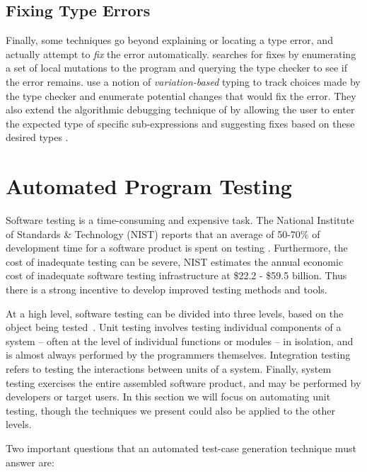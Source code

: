 \subsection{Fixing Type Errors}
\label{sec:fixing-type-errors}
Finally, some techniques go beyond explaining or locating a type error,
and actually attempt to \emph{fix} the error automatically.
%
\citet{Lerner2007-dt} searches for fixes by enumerating a
set of local mutations to the program and querying the type checker to
see if the error remains.
%
\citet{Chen2014-gd} use a notion of \emph{variation-based} typing to
track choices made by the type checker and enumerate potential
changes that would fix the error.
%
They also extend the algorithmic debugging technique of
\citeauthor{Chitil2001-td} by allowing the user to enter the expected
type of specific sub-expressions and suggesting fixes based on these
desired types \citep{Chen2014-vm}.

\section{Automated Program Testing}
\label{sec:automated-program-testing}

Software testing is a time-consuming and expensive task. The National
Institute of Standards \& Technology (NIST) reports that an average of
50-70\% of development time for a software product is spent on testing
\citep{tassey_economic_2002}.
%
Furthermore, the cost of inadequate testing can be severe, NIST
estimates the annual economic cost of inadequate software testing
infrastructure at \$22.2 - \$59.5 billion.
%
Thus there is a strong incentive to develop improved testing methods and
tools.

At a high level, software testing can be divided into three levels,
based on the object being tested~\citep{bourque_swebok:_2014}.
%
Unit testing involves testing individual components of a system --
often at the level of individual functions or modules -- in isolation,
and is almost always performed by the programmers
themselves.
%
Integration testing refers to testing the interactions between units of
a system.
%
Finally, system testing exercises the entire assembled software
product, and may be performed by developers or target users.
%
In this section we will focus on automating unit testing, though the
techniques we present could also be applied to the other levels.


Two important questions that an automated test-case generation technique
must answer are:

